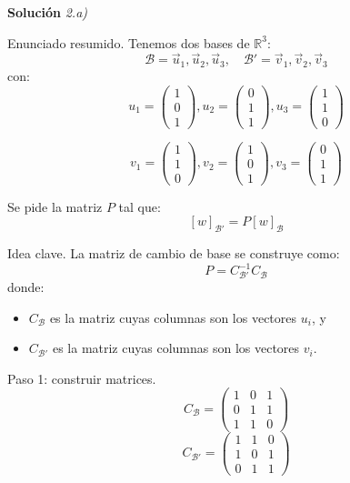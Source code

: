 \documentclass[11pt,spanish]{article}
\begin{document}
\vspace{0.5cm}
{\bf Soluci\'on }{\em 2.a)}
\vspace{0.5cm}

Enunciado resumido.
Tenemos dos bases de $\mathbb{R}^3$:
$$
\mathcal{B} = {\vec u_1, \vec u_2, \vec u_3},
\quad
\mathcal{B}' = {\vec v_1, \vec v_2, \vec v_3}
$$
con:
$$
u_1 = \begin{pmatrix}1\\0\\1\end{pmatrix},
u_2 = \begin{pmatrix}0\\1\\1\end{pmatrix},
u_3 = \begin{pmatrix}1\\1\\0\end{pmatrix}
$$

$$
v_1 = \begin{pmatrix}1\\1\\0\end{pmatrix},
v_2 = \begin{pmatrix}1\\0\\1\end{pmatrix},
v_3 = \begin{pmatrix}0\\1\\1\end{pmatrix}
$$

Se pide la matriz $P$ tal que:
$$
[w]_{\mathcal{B}'} = P[w]_{\mathcal{B}}
$$

Idea clave.
La matriz de cambio de base se construye como:
$$
P = C_{\mathcal{B}'}^{-1} C_{\mathcal{B}}
$$
donde:
\begin{itemize}
\item $C_{\mathcal{B}}$ es la matriz cuyas columnas son los vectores $u_i$, y
\item $C_{\mathcal{B}'}$ es la matriz cuyas columnas son los vectores $v_i$.
\end{itemize}

Paso 1: construir matrices.
$$
C_{\mathcal{B}} =
\begin{pmatrix}
1 & 0 & 1 \\
0 & 1 & 1 \\
1 & 1 & 0
\end{pmatrix}
$$
$$
C_{\mathcal{B}'} =
\begin{pmatrix}
1 & 1 & 0 \\
1 & 0 & 1 \\
0 & 1 & 1
\end{pmatrix}
$$
\end{document}
